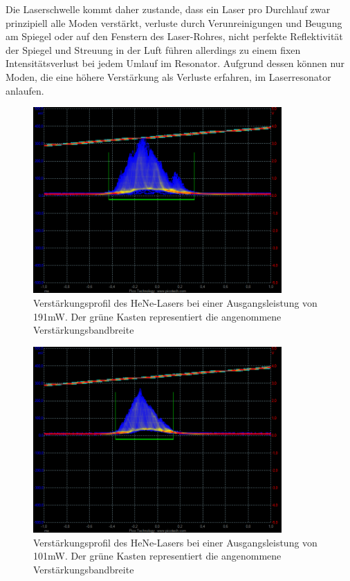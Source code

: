 \documentclass[bigchapter,colorback,accentcolor=tud4b,linedtoc,11pt]{tudreport}
\numberwithin{equation}{subsection}
\begin{document}
Die Laserschwelle kommt daher zustande, dass ein Laser pro Durchlauf zwar prinzipiell alle Moden verstärkt, verluste durch Verunreinigungen und Beugung am Spiegel oder auf den Fenstern des Laser-Rohres, nicht perfekte Reflektivität der Spiegel und Streuung in der Luft führen allerdings zu einem fixen Intensitätsverlust bei jedem Umlauf im Resonator. Aufgrund dessen können nur Moden, die eine höhere Verstärkung als Verluste erfahren, im Laserresonator anlaufen.

\begin{figure}[h!]
  \centering
    \includegraphics[width=95mm]{img/Bandbreite81cm191mW4uW.png}
  \caption{Verstärkungsprofil des HeNe-Lasers bei einer Ausgangsleistung von 191mW. Der grüne Kasten representiert die angenommene Verstärkungsbandbreite}
\end{figure}
\begin{figure}[h!]
  \centering
    \includegraphics[width=95mm]{img/Bandbreite81cm101mW4uW.png}
  \caption{Verstärkungsprofil des HeNe-Lasers bei einer Ausgangsleistung von 101mW. Der grüne Kasten representiert die angenommene Verstärkungsbandbreite}
\end{figure}
\FloatBarrier
\end{document}
